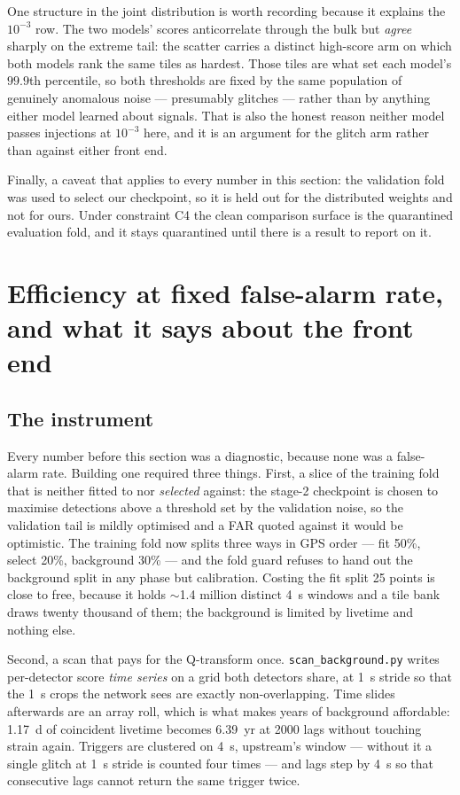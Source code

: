 \documentclass[11pt]{article}
\begin{document}
One structure in the joint distribution is worth recording because it explains the
$10^{-3}$ row. The two models' scores anticorrelate through the bulk but \emph{agree}
sharply on the extreme tail: the scatter carries a distinct high-score arm on which both
models rank the same tiles as hardest. Those tiles are what set each model's $99.9$th
percentile, so both thresholds are fixed by the same population of genuinely anomalous
noise --- presumably glitches --- rather than by anything either model learned about
signals. That is also the honest reason neither model passes injections at $10^{-3}$
here, and it is an argument for the glitch arm rather than against either front end.

Finally, a caveat that applies to every number in this section: the validation fold was
used to select our checkpoint, so it is held out for the distributed weights and not for
ours. Under constraint C4 the clean comparison surface is the quarantined evaluation
fold, and it stays quarantined until there is a result to report on it.

\section{Efficiency at fixed false-alarm rate, and what it says about the front end}
\label{sec:far}

\subsection*{The instrument}

Every number before this section was a diagnostic, because none was a false-alarm rate.
Building one required three things. First, a slice of the training fold that is neither
fitted to nor \emph{selected} against: the stage-2 checkpoint is chosen to maximise
detections above a threshold set by the validation noise, so the validation tail is
mildly optimised and a FAR quoted against it would be optimistic. The training fold now
splits three ways in GPS order --- fit 50\%, select 20\%, background 30\% --- and the
fold guard refuses to hand out the background split in any phase but calibration.
Costing the fit split 25 points is close to free, because it holds $\sim$1.4 million
distinct 4~s windows and a tile bank draws twenty thousand of them; the background is
limited by livetime and nothing else.

Second, a scan that pays for the Q-transform once. \texttt{scan\_background.py} writes
per-detector score \emph{time series} on a grid both detectors share, at 1~s stride so
that the 1~s crops the network sees are exactly non-overlapping. Time slides afterwards
are an array roll, which is what makes years of background affordable: 1.17~d of
coincident livetime becomes 6.39~yr at 2000 lags without touching strain again.
Triggers are clustered on 4~s, upstream's window --- without it a single glitch at 1~s
stride is counted four times --- and lags step by 4~s so that consecutive lags cannot
return the same trigger twice.
\end{document}
